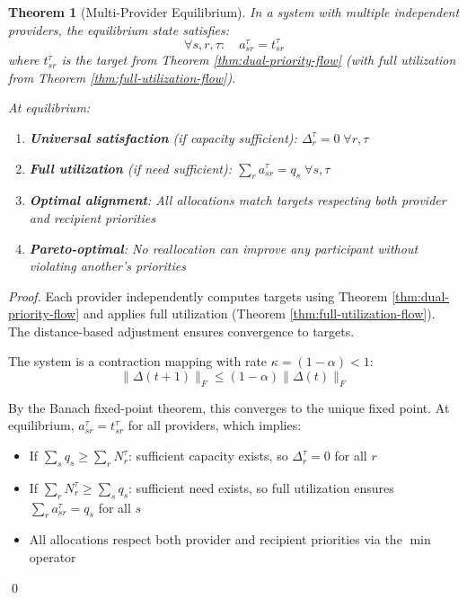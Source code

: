 \documentclass[11pt]{article}
\newtheorem{theorem}{Theorem}
\begin{document}
\begin{theorem}[Multi-Provider Equilibrium]
\label{thm:multi-provider-equilibrium}
In a system with multiple independent providers, the equilibrium state satisfies:
\[
\forall s,r,\tau: \quad a_{sr}^\tau = t_{sr}^\tau
\]
where $t_{sr}^\tau$ is the target from Theorem \ref{thm:dual-priority-flow} (with full utilization from Theorem \ref{thm:full-utilization-flow}).

At equilibrium:
\begin{enumerate}
\item \textbf{Universal satisfaction} (if capacity sufficient): $\Delta_r^\tau = 0 \; \forall r,\tau$
\item \textbf{Full utilization} (if need sufficient): $\sum_r a_{sr}^\tau = q_s \; \forall s,\tau$
\item \textbf{Optimal alignment}: All allocations match targets respecting both provider and recipient priorities
\item \textbf{Pareto-optimal}: No reallocation can improve any participant without violating another's priorities
\end{enumerate}
\end{theorem}

\begin{proof}
Each provider independently computes targets using Theorem \ref{thm:dual-priority-flow} and applies full utilization (Theorem \ref{thm:full-utilization-flow}). The distance-based adjustment ensures convergence to targets. 

The system is a contraction mapping with rate $\kappa = (1-\alpha) < 1$:
\[
\|\Delta(t+1)\|_F \leq (1-\alpha) \|\Delta(t)\|_F
\]

By the Banach fixed-point theorem, this converges to the unique fixed point. At equilibrium, $a_{sr}^\tau = t_{sr}^\tau$ for all providers, which implies:
\begin{itemize}
\item If $\sum_s q_s \geq \sum_r N_r^\tau$: sufficient capacity exists, so $\Delta_r^\tau = 0$ for all $r$
\item If $\sum_r N_r^\tau \geq \sum_s q_s$: sufficient need exists, so full utilization ensures $\sum_r a_{sr}^\tau = q_s$ for all $s$
\item All allocations respect both provider and recipient priorities via the $\min$ operator
\end{itemize}
\qed
\end{proof}
\end{document}
